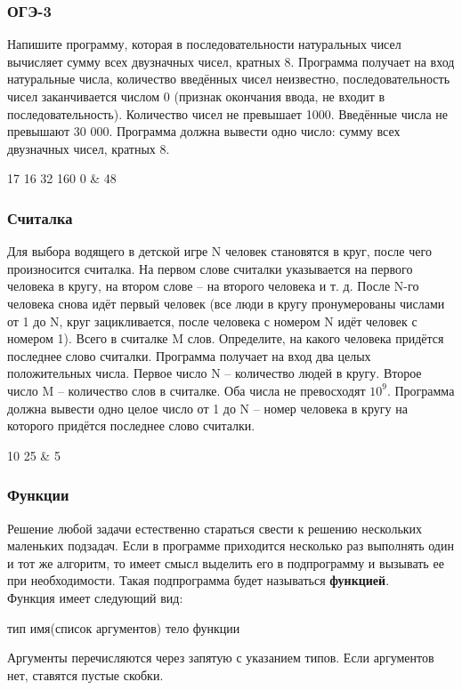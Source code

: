 \begin{frame}
	\frametitle{ОГЭ-3}
	Напишите программу, которая в последовательности натуральных чисел вычисляет
	сумму всех двузначных чисел, кратных 8.
	\inp
	Программа получает на вход натуральные числа, количество введённых чисел
	неизвестно, последовательность чисел заканчивается числом 0 (признак
	окончания ввода, не входит в последовательность). Количество чисел не
	превышает 1000. Введённые числа не превышают 30 000.
	\out
	Программа должна вывести одно число: сумму всех двузначных чисел, кратных 8.
	\begin{ex}
	17 16 32 160 0 & 48 \tb
	\end{ex}
\end{frame}

\begin{frame}
	\frametitle{Считалка}
	Для выбора водящего в детской игре N человек становятся в круг, после чего
	произносится считалка. На первом слове считалки указывается на первого
	человека в кругу, на втором слове -- на второго человека и т. д. После N-го
	человека снова идёт первый человек (все люди в кругу пронумерованы числами от
	1 до N, круг зацикливается, после человека с номером N идёт человек с номером
	1). Всего в считалке M слов. Определите, на какого человека придётся
	последнее слово считалки.
	\inp 
	Программа получает на вход два целых положительных числа. Первое число N –
	количество людей в кругу. Второе число M -- количество слов в считалке. Оба
	числа не превосходят $10^9$.
	\out
	Программа должна вывести одно целое число от 1 до N -- номер человека в кругу
	на которого придётся последнее слово считалки.
	\begin{ex}
	10 25 & 5 \tb
	\end{ex}
\end{frame}

\begin{frame}[fragile]
	\frametitle{Функции}
	Решение любой задачи естественно стараться свести к решению нескольких
	маленьких подзадач. Если в программе приходится несколько раз выполнять один и
	тот же алгоритм, то имеет смысл выделить его в подпрограмму и вызывать ее при
	необходимости. Такая подпрограмма будет называться {\bf функцией}. \\
	
	Функция имеет следующий вид:
	\begin{code}
тип имя(список аргументов)
{
	тело функции
}
	\end{code}

	Аргументы перечисляются через запятую с указанием типов. Если аргументов нет,
	ставятся пустые скобки.
\end{frame}

